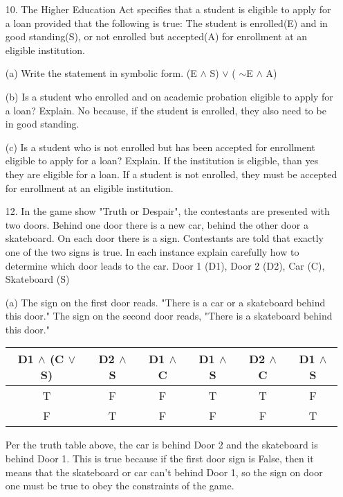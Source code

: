 \documentclass{article}
\begin{document}
\begin{itemize}
    (d) (A $\vee \sim$C) $\wedge$ D {\color{blue} It is snowing or the streets are slick, and the trees are green.}
    
    (e) $\sim$ (A $\wedge \sim$D) {\color{blue} It is not the case that, it is snowing and the trees are not green.}
    
    (f) $\sim$ (A $\wedge \sim$C) {\color{blue} It is not the case that, it is snowing and the streets are slick.}
    
    \item[10.] The Higher Education Act specifies that a student is eligible to apply for a loan provided that the following is true: The student is enrolled(E) and in good standing(S), or not enrolled but accepted(A) for enrollment at an eligible institution.  
    
    (a) Write the statement in symbolic form. {\color{blue} (E $\wedge$ S) $\vee$ ( $\sim$E $\wedge$ A)}
    
    (b) Is a student who enrolled and on academic probation eligible to apply for a loan? Explain.
    {\color{blue} No because, if the student is enrolled, they also need to be in good standing.}
    
    (c) Is a student who is not enrolled but has been accepted for enrollment eligible to apply for a loan? Explain.  {\color{blue} If the institution is eligible, than yes they are eligible for a loan.  If a student is not enrolled, they must be accepted for enrollment at an eligible institution.}
    
    \item[12.] In the game show "Truth or Despair", the contestants are presented with two doors.  Behind one door there is a new car, behind the other door a skateboard.  On each door there is a sign.  Contestants are told that exactly one of the two signs is true.   In each instance explain carefully how to determine which door leads to the car.   Door 1 (D1), Door 2 (D2), Car (C), Skateboard (S)
    
    (a) The sign on the first door reads. "There is a car or a skateboard behind this door." The sign on the second door reads, "There is a skateboard behind this door." 
    \begin{center}
        \begin{tabular}{|c|c||c|c|c|c|}
            \hline
            D1 $\wedge$ (C $\vee$ S) & D2 $\wedge$ S & D1 $\wedge$ C & D1 $\wedge$ S & D2 $\wedge$ C & D1 $\wedge$ S\\
            \hline
            \rowcolor{LightCyan}
            T & F & F & T & T & F\\
            \hline
            \rowcolor{LightRed}
            F & T & F & F & F & T\\
            \hline
        \end{tabular}
    \end{center}
    {\color{blue}Per the truth table above, the car is behind Door 2 and the skateboard is behind Door 1.  This is true because if the first door sign is False, then it means that the skateboard or car can't behind Door 1, so the sign on door one must be true to obey the constraints of the game.}
    

\end{itemize}
\end{document}
